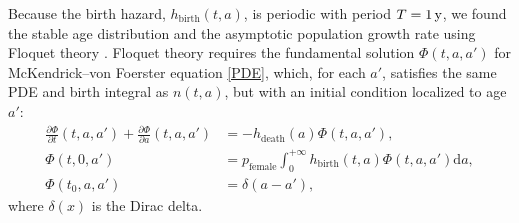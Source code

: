 \documentclass[12pt]{article}
\newcommand{\md}{\mathrm{d}}
\begin{document}
Because the birth hazard, $h_{\text{birth}}(t, a)$,
is periodic with period $T = \unit[1]{y}$,
we found the stable age distribution and the asymptotic population
growth rate using Floquet theory \autocite{parker_1992}.  Floquet
theory requires the fundamental solution $\Phi(t, a, a')$
for McKendrick--von Foerster equation \eqref{PDE}, which, for each
$a'$,
satisfies the same PDE and birth integral as $n(t, a)$,
but with an initial condition localized to age $a'$:
\begin{equation}
  \label{fundamental_PDE}
  \begin{split}
    \frac{\partial \Phi}{\partial t}(t, a, a')
    + \frac{\partial \Phi}{\partial a}(t, a, a')
    &= - h_{\text{death}}(a) \Phi(t, a, a'),
    \\
    \Phi(t, 0, a') &=
    p_{\text{female}}
    \int_0^{+\infty} h_{\text{birth}}(t, a) \Phi(t, a, a') \md a,
    \\
    \Phi(t_0, a, a') &= \delta(a - a'),
  \end{split}
\end{equation}
where $\delta(x)$ is the Dirac delta.
\end{document}
